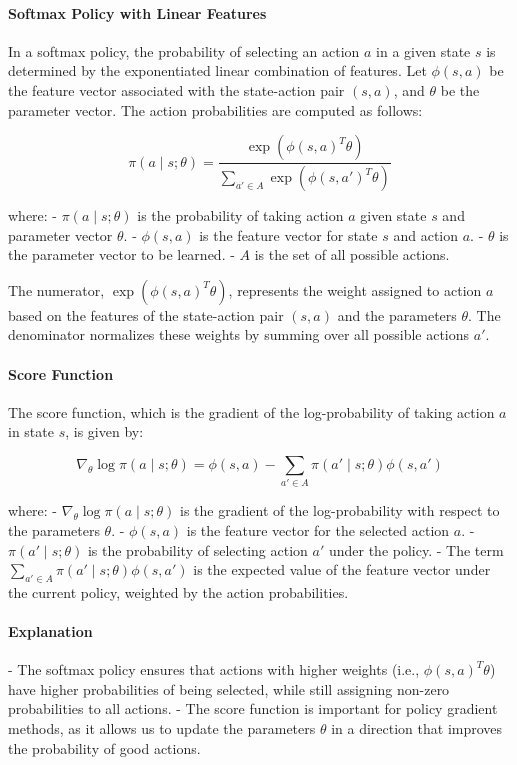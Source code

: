 \documentclass[10pt, oneside]{article}
\theoremstyle{definition}
\begin{document}
\paragraph{Softmax Policy with Linear Features}

In a softmax policy, the probability of selecting an action $a$ in a given state $s$ is determined by the exponentiated linear combination of features. Let $\phi(s, a)$ be the feature vector associated with the state-action pair $(s, a)$, and $\theta$ be the parameter vector. The action probabilities are computed as follows:

\[
\pi(a \mid s; \theta) = \frac{\exp(\phi(s, a)^T \theta)}{\sum_{a' \in A} \exp(\phi(s, a')^T \theta)}
\]

where:
- $\pi(a \mid s; \theta)$ is the probability of taking action $a$ given state $s$ and parameter vector $\theta$.
- $\phi(s, a)$ is the feature vector for state $s$ and action $a$.
- $\theta$ is the parameter vector to be learned.
- $A$ is the set of all possible actions.

The numerator, $\exp(\phi(s, a)^T \theta)$, represents the weight assigned to action $a$ based on the features of the state-action pair $(s, a)$ and the parameters $\theta$. The denominator normalizes these weights by summing over all possible actions $a'$.

\paragraph{Score Function}

The score function, which is the gradient of the log-probability of taking action $a$ in state $s$, is given by:

\[
\nabla_\theta \log \pi(a \mid s; \theta) = \phi(s, a) - \sum_{a' \in A} \pi(a' \mid s; \theta) \phi(s, a')
\]

where:
- $\nabla_\theta \log \pi(a \mid s; \theta)$ is the gradient of the log-probability with respect to the parameters $\theta$.
- $\phi(s, a)$ is the feature vector for the selected action $a$.
- $\pi(a' \mid s; \theta)$ is the probability of selecting action $a'$ under the policy.
- The term $\sum_{a' \in A} \pi(a' \mid s; \theta) \phi(s, a')$ is the expected value of the feature vector under the current policy, weighted by the action probabilities.

\paragraph{Explanation}
- The softmax policy ensures that actions with higher weights (i.e., $\phi(s, a)^T \theta$) have higher probabilities of being selected, while still assigning non-zero probabilities to all actions.
- The score function is important for policy gradient methods, as it allows us to update the parameters $\theta$ in a direction that improves the probability of good actions.
\end{document}
